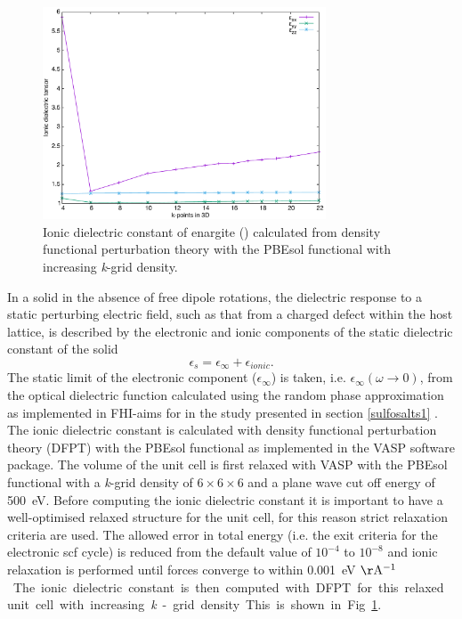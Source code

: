 \documentclass[11pt, twoside]{report}
\begin{document}
\begin{figure}[h!]
    \centering
    \includegraphics[width=0.75\textwidth]{figures/enargite_ionic_dielectric.pdf}
    \caption{Ionic dielectric constant of enargite ({\enargite}) calculated from density functional perturbation theory with the PBEsol functional with increasing \textit{k}-grid density.}
    \label{enargite_ionic_dielectric}
\end{figure}

In a solid in the absence of free dipole rotations, the dielectric response to a static perturbing electric field, such as that from a charged defect within the host lattice, is described by the electronic and ionic components of the static dielectric constant of the solid 
\begin{equation} \label{dielectric_total}
\epsilon_s = \epsilon_{\infty} + \epsilon_{ionic} .
\end{equation}
The static limit of the electronic component ($\epsilon_{\infty}$) is taken, i.e.  $\epsilon_{\infty}(\omega \rightarrow 0)$, from the optical dielectric function calculated using the random phase approximation as implemented in FHI-aims for {\enargite} in the study presented in section \ref{sulfosalts1} \cite{sulfosalts_paper}.
The ionic dielectric constant is calculated with density functional perturbation theory (DFPT) with the PBEsol functional as implemented in the VASP \cite{VASP} software package. The volume of the unit cell is first relaxed with VASP with the PBEsol functional with a \textit{k}-grid density of $6\times6\times6$ and a plane wave cut off energy of \SI{500}{eV}. Before computing the ionic dielectric constant it is important to have a well-optimised relaxed structure for the unit cell, for this reason strict relaxation criteria are used. The allowed error in total energy (i.e. the exit criteria for the electronic scf cycle) is reduced from the default value of $10^{-4}$ to $10^{-8}$ and ionic relaxation is performed until forces converge to within \SI{0.001}{eV $\mathrm{\AA^{-1}}$}. The ionic dielectric constant is then computed with DFPT for this relaxed unit cell with increasing \textit{k}-grid density. This is shown in Fig.~\ref{enargite_ionic_dielectric}.
\end{document}
